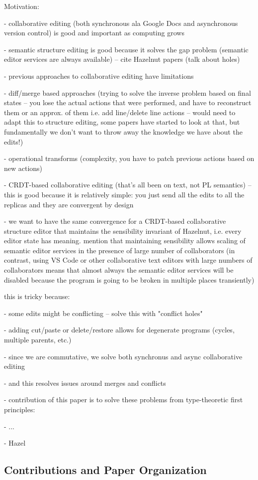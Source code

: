 \newpage




Motivation:

- collaborative editing (both synchronous ala Google Docs and asynchronous version control)
is good and important as computing grows

- semantic structure editing is good because it solves the gap problem (semantic editor services
are always available) -- cite Hazelnut papers (talk about holes)

- previous approaches to collaborative editing have limitations

- diff/merge based approaches (trying to solve the inverse problem based on final states --
you lose the actual actions that were performed, and have to reconstruct them or an approx.
of them i.e. add line/delete line actions -- would need to adapt this to structure editing,
some papers have started to look at that, but fundamentally we don't want to throw away the
knowledge we have about the edits!)

- operational transforms (complexity, you have to patch previous actions based on new actions)

- CRDT-based collaborative editing (that's all been on text, not PL semantics) -- this is good
because it is relatively simple: you just send all the edits to all the replicas and they are
convergent by design

- we want to have the same convergence for a CRDT-based collaborative structure editor that maintains
the sensibility invariant of Hazelnut, i.e. every editor state has meaning. mention that maintaining sensibility
allows scaling of semantic editor services in the presence of large number of collaborators (in contrast,
using VS Code or other collaborative text editors with large numbers of collaborators means that almost always
the semantic editor services will be disabled because the program is going to be broken in multiple places
transiently)

this is tricky because:

- some edits might be conflicting -- solve this with "conflict holes"

- adding cut/paste or delete/restore allows for degenerate programs (cycles, multiple parents, etc.)

- since we are commutative, we solve both synchronus and async collaborative editing

- and this resolves issues around merges and conflicts

- contribution of this paper is to solve these problems from type-theoretic first principles:

- ...

- Hazel

\subsection{Contributions and Paper Organization}%
\label{sec:Contributions and Paper Organization}
